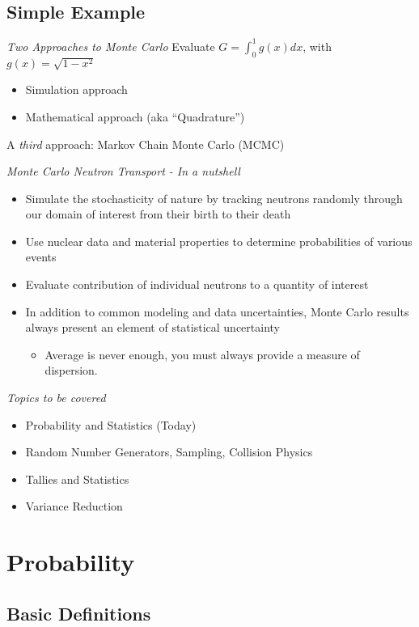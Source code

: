 \subsection{Simple Example}
\emph{Two Approaches to Monte Carlo}
 Evaluate $G=\int_{0}^{1} g(x)dx$, with $g(x) = \sqrt{1-x^2}$
 \begin{itemize}
   \item Simulation approach
   \item Mathematical approach (aka ``Quadrature'')
 \end{itemize}
 \vfill
 A \emph{ third} approach: Markov Chain Monte Carlo (MCMC)


\emph{Monte Carlo Neutron Transport - In a nutshell}
 \begin{itemize}
  \item Simulate the stochasticity of nature by tracking neutrons randomly through our domain of interest from their birth to their death
  \item Use nuclear data and material properties to determine probabilities of various events
  \item Evaluate contribution of individual neutrons to a quantity of interest
  \item In addition to common modeling and data uncertainties, Monte Carlo results always present an element of statistical uncertainty
  \begin{itemize}
    \item Average is never enough, you must always provide a measure of dispersion.
  \end{itemize}
 \end{itemize}


\emph{Topics to be covered}
   \begin{itemize}
      \item Probability and Statistics (Today)
      \item Random Number Generators, Sampling, Collision Physics
      \item Tallies and Statistics
      \item Variance Reduction
   \end{itemize}


\section{Probability}

\subsection{Basic Definitions}

